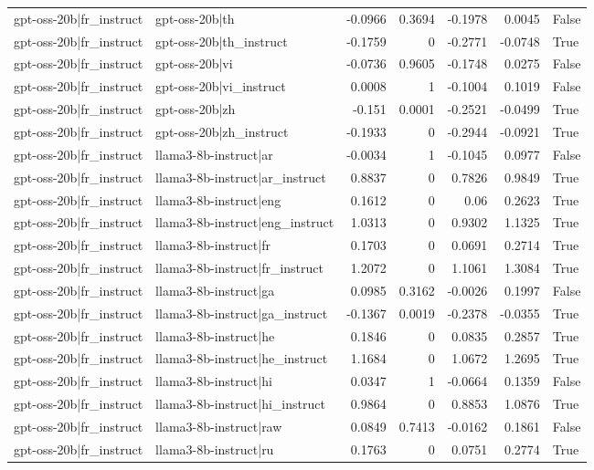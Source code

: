 \begin{table}
\begin{tabular}{l l r r r r l}
gpt-oss-20b|fr_instruct & gpt-oss-20b|th & -0.0966 & 0.3694 & -0.1978 & 0.0045 & False \\
gpt-oss-20b|fr_instruct & gpt-oss-20b|th_instruct & -0.1759 & 0 & -0.2771 & -0.0748 & True \\
gpt-oss-20b|fr_instruct & gpt-oss-20b|vi & -0.0736 & 0.9605 & -0.1748 & 0.0275 & False \\
gpt-oss-20b|fr_instruct & gpt-oss-20b|vi_instruct & 0.0008 & 1 & -0.1004 & 0.1019 & False \\
gpt-oss-20b|fr_instruct & gpt-oss-20b|zh & -0.151 & 0.0001 & -0.2521 & -0.0499 & True \\
gpt-oss-20b|fr_instruct & gpt-oss-20b|zh_instruct & -0.1933 & 0 & -0.2944 & -0.0921 & True \\
gpt-oss-20b|fr_instruct & llama3-8b-instruct|ar & -0.0034 & 1 & -0.1045 & 0.0977 & False \\
gpt-oss-20b|fr_instruct & llama3-8b-instruct|ar_instruct & 0.8837 & 0 & 0.7826 & 0.9849 & True \\
gpt-oss-20b|fr_instruct & llama3-8b-instruct|eng & 0.1612 & 0 & 0.06 & 0.2623 & True \\
gpt-oss-20b|fr_instruct & llama3-8b-instruct|eng_instruct & 1.0313 & 0 & 0.9302 & 1.1325 & True \\
gpt-oss-20b|fr_instruct & llama3-8b-instruct|fr & 0.1703 & 0 & 0.0691 & 0.2714 & True \\
gpt-oss-20b|fr_instruct & llama3-8b-instruct|fr_instruct & 1.2072 & 0 & 1.1061 & 1.3084 & True \\
gpt-oss-20b|fr_instruct & llama3-8b-instruct|ga & 0.0985 & 0.3162 & -0.0026 & 0.1997 & False \\
gpt-oss-20b|fr_instruct & llama3-8b-instruct|ga_instruct & -0.1367 & 0.0019 & -0.2378 & -0.0355 & True \\
gpt-oss-20b|fr_instruct & llama3-8b-instruct|he & 0.1846 & 0 & 0.0835 & 0.2857 & True \\
gpt-oss-20b|fr_instruct & llama3-8b-instruct|he_instruct & 1.1684 & 0 & 1.0672 & 1.2695 & True \\
gpt-oss-20b|fr_instruct & llama3-8b-instruct|hi & 0.0347 & 1 & -0.0664 & 0.1359 & False \\
gpt-oss-20b|fr_instruct & llama3-8b-instruct|hi_instruct & 0.9864 & 0 & 0.8853 & 1.0876 & True \\
gpt-oss-20b|fr_instruct & llama3-8b-instruct|raw & 0.0849 & 0.7413 & -0.0162 & 0.1861 & False \\
gpt-oss-20b|fr_instruct & llama3-8b-instruct|ru & 0.1763 & 0 & 0.0751 & 0.2774 & True \\

\end{tabular}
\end{table}
